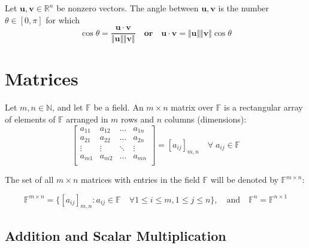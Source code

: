 \documentclass{article}
\begin{document}
\begin{theorem}\label{thm:cosinedotproduct}
    Let $\bm{u}, \bm{v} \in \mathbb{R}^n$ be nonzero vectors. The angle between $\bm{u}, \bm{v}$ is the number $\theta \in [0,\pi]$ for which 
    \begin{equation*}
        \cos \theta = \frac{\bm{u}\cdot \bm{v}}{\Vert\bm{u}\Vert\Vert\bm{v}\Vert} \quad \textbf{or} \quad \bm{u}\cdot \bm{v} = \Vert\bm{u}\Vert\Vert\bm{v}\Vert \cos \theta
    \end{equation*}
\end{theorem}

\section{Matrices}

\begin{definition}
    Let $m,n \in \mathbb{N}$, and let $\mathbb{F}$ be a field. An $m \times n$ matrix over $\mathbb{F}$ is a rectangular array of elements of $\mathbb{F}$ arranged in $m$ rows and $n$ columns (dimensions):
    \begin{equation}
        \begin{bmatrix}
            a_{11} & a_{12} & \dots & a_{1n} \\ 
            a_{21} & a_{22} & \dots & a_{2n} \\ 
            \vdots & \vdots & \ddots & \vdots \\
            a_{m1} & a_{m2} & \dots & a_{mn} \\  
        \end{bmatrix} = [a_{ij}]_{m,n} \quad \forall \; a_{ij} \in \mathbb{F} 
    \end{equation}
\end{definition}

\noindent The set of all $m \times n$ matrices with entries in the field $\mathbb{F}$ will be denoted by $\mathbb{F}^{m\times n}$:

\begin{equation*}
    \mathbb{F}^{m\times n} = \{[a_{ij}]_{m,n}:a_{ij}\in \mathbb{F} \quad \forall 1 \leq i \leq m, 1 \leq j \leq n\}, \quad \text{and} \quad \mathbb{F}^n = \mathbb{F}^{n\times 1} 
\end{equation*}

\subsection{Addition and Scalar Multiplication}
\lipsum[1]
\end{document}
